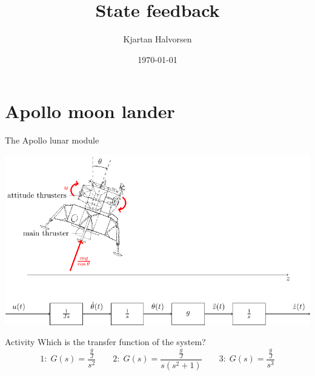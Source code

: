 \documentclass[presentation,aspectratio=169]{beamer}
\author{Kjartan Halvorsen}
\date{\today}
\title{State feedback}
\begin{document}
\maketitle



\section{Apollo moon lander}
\label{sec:orgafa4c5d}

\begin{frame}[label={sec:orgd5b4d01}]{The Apollo lunar module}
\begin{center}
\includegraphics[width=0.7\linewidth]{../../figures/fig-apollo}
\end{center}

\pause

\alert{Activity} Which is the transfer function of the system?
   \[1: \; G(s) = \frac{\frac{g}{J} }{s^2}\qquad 2: \; G(s) = \frac{\frac{g}{J} }{s(s^2 + 1)} \qquad 3: \; G(s) = \frac{\frac{g}{J} }{s^3}\]
\end{frame}
\end{document}
